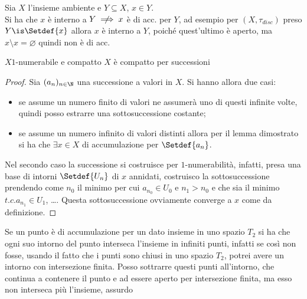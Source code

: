 

\begin{oss}
Sia $X$ l'insieme ambiente e $Y\subseteq X$, $x\in Y$.\\
Si ha che $x$ è interno a $Y \centernot\implies x$ è di acc. per $Y$, ad esempio per $(X, \tau _{disc})$ preso $Y\is\Setdef{x}$ allora $x$ è interno a $Y$, poiché quest'ultimo è aperto, ma ${x}\setminus {x} = \varnothing$ quindi non è di acc.
\end{oss}

\begin{prop}
$X 1$-numerabile e compatto \then $X$ è compatto per successioni
\end{prop}
\begin{proof}
Sia $(a_n)_{n\in\N}$ una successione a valori in $X$. Si hanno allora due casi:
\begin{itemize}
\item se assume un numero finito di valori ne assumerà uno di questi infinite volte, quindi posso estrarre una sottosuccessione costante;
\item se assume un numero infinito di valori distinti allora per il lemma dimostrato si ha che $\exists x\in X$ di accumulazione per $\Setdef{a_n}$.
\end{itemize}
Nel secondo caso la successione si costruisce per $1$-numerabilità, infatti, presa una base di intorni $\Setdef{U_n}$ di $x$ \wlg annidati, costruisco la sottosuccessione prendendo come $n_0$ il minimo per cui $a_{n_0}\in U_0$ e $n_1 > n_0$ e che sia il minimo $t.c. a_{n_1}\in U_1$, \dots . Questa sottosuccessione ovviamente converge a $x$ come da definizione.
\end{proof}

\begin{oss}
Se un punto è di accumulazione per un dato insieme in uno spazio $T_2$ si ha che ogni suo intorno del punto interseca l'insieme in infiniti punti, infatti se così non fosse, usando il fatto che i punti sono chiusi in uno spazio $T_2$, potrei avere un intorno con intersezione finita. Posso sottrarre questi punti all'intorno, che continua a contenere il punto e ad essere aperto per intersezione finita, ma esso non interseca più l'insieme, assurdo
\end{oss}

